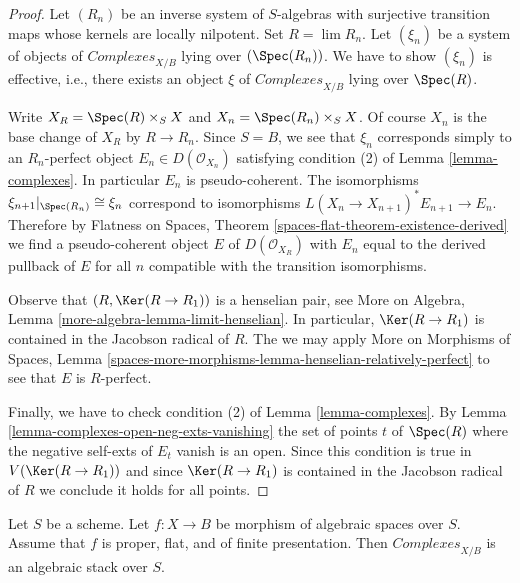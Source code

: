 \begin{proof}
Let $(R_n)$ be an inverse system of $S$-algebras with surjective transition
maps whose kernels are locally nilpotent. Set $R = \lim R_n$.
Let $(\xi_n)$ be a system of objects of $\textit{Complexes}_{X/B}$
lying over $(\Spec(R_n))$. We have to show $(\xi_n)$ is effective, i.e.,
there exists an object $\xi$ of $\textit{Complexes}_{X/B}$ lying over
$\Spec(R)$.

\medskip\noindent
Write $X_R = \Spec(R) \times_S X$ and $X_n = \Spec(R_n) \times_S X$.
Of course $X_n$ is the base change of $X_R$ by $R \to R_n$. Since $S = B$,
we see that $\xi_n$ corresponds simply to an $R_n$-perfect object
$E_n \in D(\mathcal{O}_{X_n})$ satisfying condition (2) of
Lemma \ref{lemma-complexes}. In particular $E_n$ is pseudo-coherent.
The isomorphisms $\xi_{n + 1}|_{\Spec(R_n)} \cong \xi_n$
correspond to isomorphisms $L(X_n \to X_{n + 1})^*E_{n + 1} \to E_n$.
Therefore by
Flatness on Spaces, Theorem \ref{spaces-flat-theorem-existence-derived}
we find a pseudo-coherent object $E$ of $D(\mathcal{O}_{X_R})$
with $E_n$ equal to the derived pullback of $E$ for all $n$
compatible with the transition isomorphisms.

\medskip\noindent
Observe that $(R, \Ker(R \to R_1))$ is a henselian pair, see
More on Algebra, Lemma \ref{more-algebra-lemma-limit-henselian}.
In particular, $\Ker(R \to R_1)$ is contained in the Jacobson
radical of $R$. The we may apply More on Morphisms of Spaces, Lemma
\ref{spaces-more-morphisms-lemma-henselian-relatively-perfect}
to see that $E$ is $R$-perfect.

\medskip\noindent
Finally, we have to check condition (2) of Lemma \ref{lemma-complexes}.
By Lemma \ref{lemma-complexes-open-neg-exts-vanishing}
the set of points $t$ of $\Spec(R)$ where the negative self-exts of $E_t$
vanish is an open. Since this condition is true in $V(\Ker(R \to R_1))$
and since $\Ker(R \to R_1)$ is contained in the Jacobson
radical of $R$ we conclude it holds for all points.
\end{proof}

\begin{theorem}
\label{theorem-complexes-algebraic}
\begin{reference}
\cite{lieblich-complexes}
\end{reference}
Let $S$ be a scheme. Let $f : X \to B$ be morphism of algebraic spaces
over $S$. Assume that $f$ is proper, flat, and of finite presentation.
Then $\textit{Complexes}_{X/B}$ is an algebraic stack over $S$.
\end{theorem}

